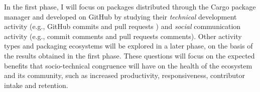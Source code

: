 In the first phase, I will focus on packages distributed through the Cargo package manager and developed on GitHub %
by studying their \emph{technical} development activity (e.g., GitHub commits and pull requests%
) and \emph{social} communication activity %
(e.g., commit comments and pull requests comments). 
%
Other %
activity types and packaging 
ecosystems will be explored in a later phase, on the basis of the results obtained %
in the first phase. %
These questions will focus on the expected benefits that socio-technical congruence will have on the health of the ecosystem and its community, such as increased productivity, responsiveness, contributor intake and retention.